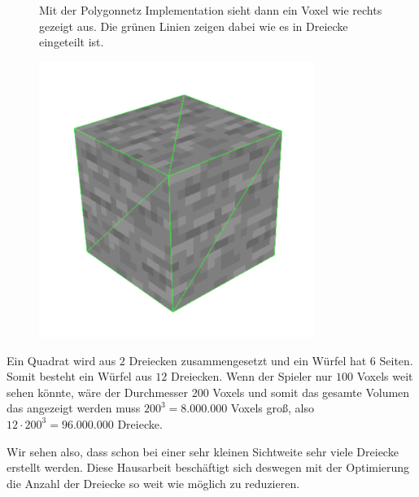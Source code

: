 \begin{figure}[ht]
	\begin{minipage}[c]{0.48\textwidth}
Mit der Polygonnetz Implementation sieht dann ein
Voxel wie rechts gezeigt aus.
Die grünen Linien zeigen dabei wie es in Dreiecke
eingeteilt ist.
	\end{minipage}
	\begin{minipage}[c]{0.5\textwidth}
		\begin{center}
\includegraphics[width=0.8\textwidth]{assets/SingleVoxel.png}
		\end{center}
	\end{minipage}\hfill
\end{figure}

\goodbreak

Ein Quadrat wird aus $2$ Dreiecken zusammengesetzt
und ein Würfel hat $6$ Seiten. Somit besteht ein Würfel
aus $12$ Dreiecken. Wenn der Spieler nur $100$ Voxels
weit sehen könnte, wäre der Durchmesser $200$ Voxels
und somit das gesamte Volumen das angezeigt werden
muss $200^3 = 8.000.000$ Voxels groß, also
$12 \cdot 200^3 = 96.000.000$ Dreiecke.

Wir sehen also, dass schon bei einer sehr kleinen
Sichtweite sehr viele Dreiecke erstellt werden.
Diese Hausarbeit beschäftigt sich deswegen mit der
Optimierung die Anzahl der Dreiecke so weit wie
möglich zu reduzieren.
